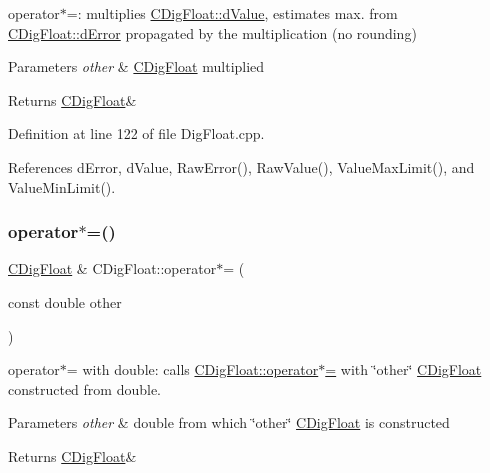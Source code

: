 operator$\ast$=\+: multiplies \hyperlink{classCDigFloat_a4bbe69e30dd4e20527362493aa9aaf96}{C\+Dig\+Float\+::d\+Value}, estimates max. from \hyperlink{classCDigFloat_a25eb3782d1e727ff007a48f8308e3d4d}{C\+Dig\+Float\+::d\+Error} propagated by the multiplication (no rounding) 


\begin{DoxyParams}{Parameters}
{\em other} & \hyperlink{classCDigFloat}{C\+Dig\+Float} multiplied \\
\hline
\end{DoxyParams}
\begin{DoxyReturn}{Returns}
\hyperlink{classCDigFloat}{C\+Dig\+Float}\& 
\end{DoxyReturn}


Definition at line 122 of file Dig\+Float.\+cpp.



References d\+Error, d\+Value, Raw\+Error(), Raw\+Value(), Value\+Max\+Limit(), and Value\+Min\+Limit().

\mbox{\label{classCDigFloat_a9a01529fa684f7f5eb915b2d308578ea}} 
\subsubsection{\texorpdfstring{operator$\ast$=()}{operator*=()}\hspace{0.1cm}{\footnotesize\ttfamily [2/2]}}
{\footnotesize\ttfamily \hyperlink{classCDigFloat}{C\+Dig\+Float} \& C\+Dig\+Float\+::operator$\ast$= (\begin{DoxyParamCaption}\item[{const double}]{other }\end{DoxyParamCaption})}



operator$\ast$= with double\+: calls \hyperlink{classCDigFloat_a9535d47a31a3f1cfa487cc8c567a4a12}{C\+Dig\+Float\+::operator$\ast$=} with \char`\"{}other\char`\"{} \hyperlink{classCDigFloat}{C\+Dig\+Float} constructed from double. 


\begin{DoxyParams}{Parameters}
{\em other} & double from which \char`\"{}other\char`\"{} \hyperlink{classCDigFloat}{C\+Dig\+Float} is constructed \\
\hline
\end{DoxyParams}
\begin{DoxyReturn}{Returns}
\hyperlink{classCDigFloat}{C\+Dig\+Float}\& 
\end{DoxyReturn}


